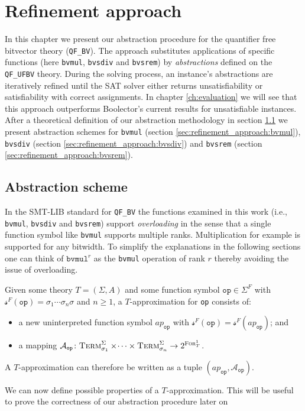 \chapter{Refinement approach}
\label{ch:refinement}
In this chapter we present our abstraction procedure for the quantifier free bitvector theory (\texttt{QF\_BV}).
The approach substitutes applications of specific functions (here \texttt{bvmul}, \texttt{bvsdiv} and \texttt{bvsrem}) by \textit{abstractions} defined on the \texttt{QF\_UFBV} theory.
During the solving process, an instance's abstractions are iteratively refined until the SAT solver either returns unsatisfiability or satisfiability with correct assignments.
In chapter \ref{ch:evaluation} we will see that this approach outperforms Boolector's current results for unsatisfiable instances.
After a theoretical definition of our abstraction methodology in section \ref{sec:refinement_approach:abstraction_scheme} we present abstraction schemes for \texttt{bvmul} (section \ref{sec:refinement_approach:bvmul}), \texttt{bvsdiv} (section \ref{sec:refinement_approach:bvsdiv}) and \texttt{bvsrem} (section \ref{sec:refinement_approach:bvsrem}).

\section{Abstraction scheme}
\label{sec:refinement_approach:abstraction_scheme}
In the SMT-LIB standard \cite{BarFT-SMTLIB} for \texttt{QF\_BV} the functions examined in this work (i.e., \texttt{bvmul}, \texttt{bvsdiv} and \texttt{bvsrem}) support \textit{overloading} in the sense that a single function symbol like \texttt{bvmul} supports multiple ranks. Multiplication for example is supported for any bitwidth.
To simplify the explanations in the following sections one can think of $\texttt{bvmul}^r$ as the \texttt{bvmul} operation of rank $r$ thereby avoiding the issue of overloading.

\begin{definition}[Approximation]
Given some theory $T=\left(\Sigma,A\right)$ and some function symbol $\texttt{op}\in\Sigma^F$ with $\mathcal{s}^F\left(\texttt{op}\right)=\sigma_1\dotsi\sigma_n\sigma$ and $n\geq1$, a $T$-approximation for \texttt{op} consists of:
\begin{itemize}
    \item a new uninterpreted function symbol $ap_{\texttt{op}}$ with $\mathcal{s}^F\left(\texttt{op}\right) = \mathcal{s}^F\left(ap_{\texttt{op}}\right)$; and
    \item a mapping $\mathcal{A}_{\texttt{op}}\colon \textsc{Term}^\Sigma_{\sigma_1}\times\dotsi\times\textsc{Term}^\Sigma_{\sigma_n} \to 2^{\textsc{For}^1_T}$.
\end{itemize}
A $T$-approximation can therefore be written as a tuple $\left(ap_{\texttt{op}}, \mathcal{A}_{\texttt{op}}\right)$.
\end{definition}
We can now define possible properties of a $T$-approximation. This will be useful to prove the correctness of our abstraction procedure later on

